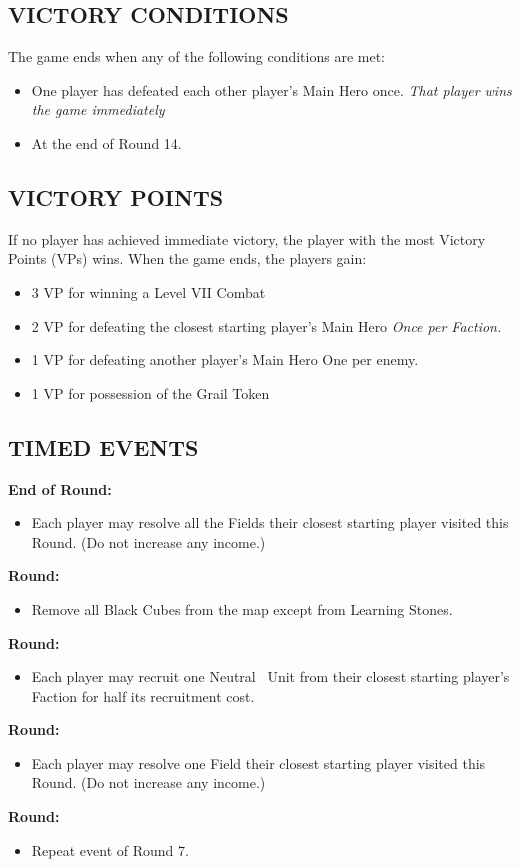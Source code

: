 \begin{multicols*}{2}
\subsection*{\MakeUppercase{Victory Conditions}}
The game ends when any of the following conditions are met:
\begin{itemize}
  \item One player has defeated each other player's Main Hero once. \textit{That player wins the game immediately}
  \item At the end of Round 14.
\end{itemize}

\subsection*{\MakeUppercase{Victory Points}}
If no player has achieved immediate victory, the player with the most Victory Points (VPs) wins. When the game ends, the players gain:
\begin{itemize}
  \item 3 VP for winning a Level VII Combat
  \item 2 VP for defeating the closest starting player's Main Hero \textit{Once per Faction.}
  \item 1 VP for defeating another player's Main Hero {One per enemy.}
  \item 1 VP for possession of the Grail Token
\end{itemize}

\subsection*{\MakeUppercase{Timed Events}}
\textbf{End of  Round:}
\begin{itemize}
  \item Each player may resolve all the Fields their closest starting player visited this Round. (Do not increase any income.)
\end{itemize}
\textbf{ Round:}
\begin{itemize}
  \item Remove all Black Cubes from the map except from Learning Stones.
\end{itemize}
\textbf{ Round:}
\begin{itemize}
  \item Each player may recruit one Neutral \silver\ Unit from their closest starting player's Faction for half its recruitment cost.
\end{itemize}
\textbf{ Round:}
\begin{itemize}
  \item Each player may resolve one Field their closest starting player visited this Round. (Do not increase any income.)
\end{itemize}
\textbf{ Round:}
\begin{itemize}
  \item Repeat event of Round 7.
\end{itemize}


\end{multicols*}

